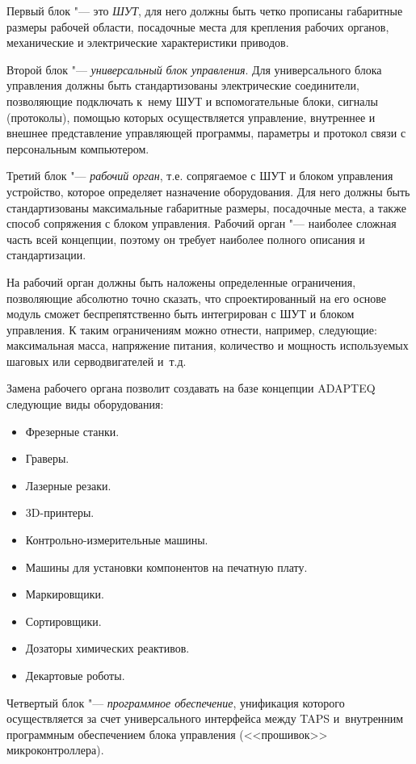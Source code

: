 Первый блок "--- это \textit{ШУТ}, для него должны быть четко прописаны габаритные размеры рабочей области, посадочные места для крепления рабочих органов, механические и электрические характеристики приводов.

Второй блок "--- \textit{универсальный} \textit{блок управления}. Для универсального блока управления должны быть стандартизованы электрические соединители, позволяющие подключать к~нему ШУТ и вспомогательные блоки, сигналы (протоколы), помощью которых осуществляется управление, внутреннее и внешнее представление управляющей программы, параметры и протокол связи с персональным компьютером.

Третий блок "--- \textit{рабочий орган}, т.е. сопрягаемое с ШУТ и блоком управления устройство, которое определяет назначение оборудования. Для него должны быть стандартизованы максимальные габаритные размеры, посадочные места, а также способ сопряжения с блоком управления. Рабочий орган "--- наиболее сложная часть всей концепции, поэтому он требует наиболее полного описания и стандартизации.

На рабочий орган должны быть наложены определенные ограничения, позволяющие абсолютно точно сказать, что спроектированный на его основе модуль сможет беспрепятственно быть интегрирован с ШУТ и блоком управления. К таким ограничениям можно отнести, например, следующие: максимальная масса, напряжение питания, количество и мощность используемых шаговых или серводвигателей и~т.\:д.

Замена рабочего органа позволит создавать на базе концепции \foreignlanguage{english}{ADAPTEQ} следующие виды оборудования:
\begin{itemize}
	\item Фрезерные станки.
	
	\item Граверы.
	
	\item Лазерные резаки.
	
	\item 3\foreignlanguage{english}{D-}принтеры.
	
	\item Контрольно-измерительные машины.
	
	\item Машины для установки компонентов на печатную плату.
	
	\item Маркировщики.
	
	\item Сортировщики.
	
	\item Дозаторы химических реактивов.
	
	\item Декартовые роботы.
	
	
\end{itemize}
Четвертый блок "--- \textit{программное обеспечение}, унификация которого осуществляется за счет универсального интерфейса между TAPS и~внутренним программным обеспечением блока управления (<<прошивок>> микроконтроллера).

